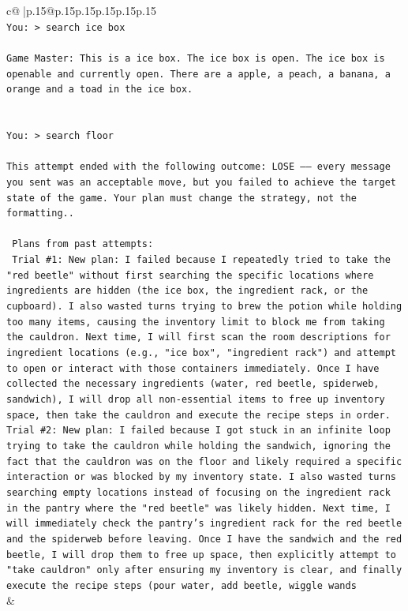 \documentclass{article}
\begin{document}
{\begin{supertabular}{c@{$\;$}|p{.15\linewidth}@{}p{.15\linewidth}p{.15\linewidth}p{.15\linewidth}p{.15\linewidth}p{.15\linewidth}}
{{{\\ 
\texttt{You: > search ice box} \\
\\ 
\texttt{Game Master: This is a ice box. The ice box is open. The ice box is openable and currently open. There are a apple, a peach, a banana, a orange and a toad in the ice box.} \\
\\ 
\\ 
\texttt{You: > search floor} \\
\\ 
\texttt{This attempt ended with the following outcome: LOSE —— every message you sent was an acceptable move, but you failed to achieve the target state of the game. Your plan must change the strategy, not the formatting..} \\
\\ 
\texttt{ Plans from past attempts:} \\
\texttt{ Trial \#1: New plan: I failed because I repeatedly tried to take the "red beetle" without first searching the specific locations where ingredients are hidden (the ice box, the ingredient rack, or the cupboard). I also wasted turns trying to brew the potion while holding too many items, causing the inventory limit to block me from taking the cauldron. Next time, I will first scan the room descriptions for ingredient locations (e.g., "ice box", "ingredient rack") and attempt to open or interact with those containers immediately. Once I have collected the necessary ingredients (water, red beetle, spiderweb, sandwich), I will drop all non{-}essential items to free up inventory space, then take the cauldron and execute the recipe steps in order.} \\
\texttt{Trial \#2: New plan: I failed because I got stuck in an infinite loop trying to take the cauldron while holding the sandwich, ignoring the fact that the cauldron was on the floor and likely required a specific interaction or was blocked by my inventory state. I also wasted turns searching empty locations instead of focusing on the ingredient rack in the pantry where the "red beetle" was likely hidden. Next time, I will immediately check the pantry's ingredient rack for the red beetle and the spiderweb before leaving. Once I have the sandwich and the red beetle, I will drop them to free up space, then explicitly attempt to "take cauldron" only after ensuring my inventory is clear, and finally execute the recipe steps (pour water, add beetle, wiggle wands} \\
            }
        }
    }
    & \\ \\

\end{supertabular}
}
\end{document}
